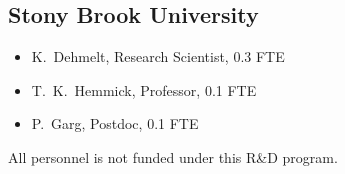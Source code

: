 \subsection{Stony Brook University}
\begin{itemize}
\item K.~Dehmelt, Research Scientist, 0.3 FTE
\item T.~K.~Hemmick, Professor, 0.1 FTE
\item P.~Garg, Postdoc, 0.1 FTE
\end{itemize}
All personnel is not funded under this R\&D program.